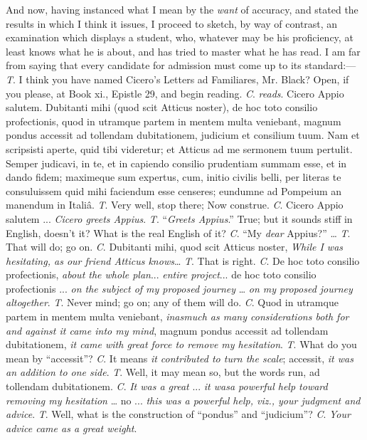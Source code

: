 And now, having instanced what I mean by the \emph{want} of
accuracy, and stated the results in which I think it issues, I proceed
to sketch, by way of contrast, an examination which displays a
student, who, whatever may be his proficiency, at least knows what he
is about, and has tried to master what he has read. I am far from
saying that every candidate for admission must come up to its
standard:—
\emph{T}. I think you have named Cicero's Letters ad Familiares, Mr.
Black? Open, if you please, at Book xi., Epistle 29, and begin reading.
\emph{C}. \emph{reads}. Cicero Appio salutem. Dubitanti mihi (quod
scit Atticus noster), de hoc toto consilio profectionis, quod in
utramque partem in mentem multa veniebant, magnum pondus accessit ad
tollendam dubitationem, judicium et consilium tuum. Nam et scripsisti
aperte, quid tibi videretur; et Atticus ad me sermonem tuum pertulit.
Semper judicavi, in te, et in capiendo consilio prudentiam summam esse,
et in dando fidem; maximeque sum expertus, cum, initio civilis belli,
per literas te consuluissem quid mihi faciendum esse censeres;
eundumne ad Pompeium an manendum in Italiâ.
\emph{T}. Very well, stop there; Now construe. \emph{C}. Cicero Appio
salutem ... \emph{Cicero greets Appius}.
\emph{T}. ``\emph{Greets Appius}.'' True; but it sounds stiff
in English, doesn't it? What is the real English of it? \emph{C}.
``My \emph{dear} Appius?'' …
\emph{T}. That will do; go on. \emph{C}. Dubitanti mihi, quod scit
Atticus noster, \emph{While I was hesitating, as our friend Atticus knows}…
\emph{T}. That is right. \emph{C}. De hoc toto consilio profectionis, \emph{about
the whole plan}... \emph{entire project}... de hoc toto consilio
profectionis ... \emph{on the subject of my proposed journey} … \emph{on
my proposed journey altogether}.
\emph{T}. Never mind; go on; any of them will do. \emph{C}. Quod in
utramque partem in mentem multa veniebant, \emph{inasmuch as many
considerations both for and against it came into my mind}, magnum
pondus accessit ad tollendam dubitationem, \emph{it came with great force
to remove my hesitation}.
\emph{T}. What do you mean by ``accessit''? \emph{C}. It means
\emph{it contributed to turn the scale}; accessit, \emph{it was an
addition to one side}.
\emph{T}. Well, it may mean so, but the words run, ad tollendam
dubitationem. \emph{C}. \emph{It was a great} ... \emph{it was}\emph{a
powerful help toward removing my hesitation} … no ... \emph{this was
a powerful help, viz., your judgment and advice}.
\emph{T}. Well, what is the construction of ``pondus'' and
``judicium''? \emph{C}. \emph{Your advice came as a great weight}.
